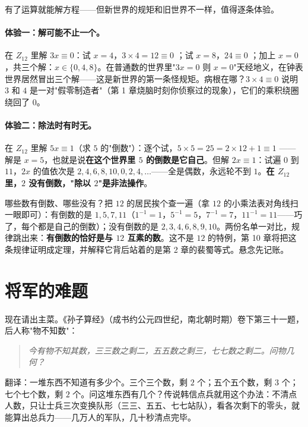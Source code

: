 有了运算就能解方程——但新世界的规矩和旧世界不一样，值得逐条体验。

\paragraph{体验一：解可能不止一个。}在 $Z_{12}$ 里解 $3x \equiv 0$：试 $x = 4$，$3\times4 = 12 \equiv 0$ \checkmark；试 $x = 8$，$24 \equiv 0$ \checkmark；加上 $x = 0$，共三个解：$x \in \{0, 4, 8\}$。在普通数的世界里"$3x = 0$ 则 $x = 0$"天经地义，在钟表世界居然冒出三个解——这是新世界的第一条怪规矩。病根在哪？$3 \times 4 \equiv 0$ 说明 $3$ 和 $4$ 是一对"假零制造者"（第 1 章烧脑时刻你侦察过的现象），它们的乘积绕圈绕回了 $0$。

\paragraph{体验二：除法时有时无。}在 $Z_{12}$ 里解 $5x \equiv 1$（求 $5$ 的"倒数"）：逐个试，$5\times5 = 25 = 2\times12+1 \equiv 1$ \checkmark——解是 $x = 5$，也就是说\textbf{在这个世界里 $5$ 的倒数是它自己}。但解 $2x \equiv 1$：试遍 $0$ 到 $11$，$2x$ 的值依次是 $2,4,6,8,10,0,2,4,\dots$——全是偶数，永远轮不到 $1$。\textbf{在 $Z_{12}$ 里，$2$ 没有倒数，"除以 $2$"是非法操作}。

哪些数有倒数、哪些没有？把 $12$ 的居民挨个查一遍（拿 $12$ 的小乘法表对角线扫一眼即可）：有倒数的是 $1, 5, 7, 11$（$1^{-1}=1$，$5^{-1}=5$，$7^{-1}=7$，$11^{-1}=11$——巧了，每个都是自己的倒数）；没有倒数的是 $2,3,4,6,8,9,10$。两份名单一对比，规律跳出来：\textbf{有倒数的恰好是与 $12$ 互素的数}。这不是 $12$ 的特例，第 10 章将把这条规律证明成定理，并解释它背后站着的是第 2 章的裴蜀等式。悬念先记账。

\section{将军的难题}

现在请出主菜。《孙子算经》（成书约公元四世纪，南北朝时期）卷下第三十一题，后人称"物不知数"：

\begin{quote}\itshape
今有物不知其数，三三数之剩二，五五数之剩三，七七数之剩二。问物几何？
\end{quote}

翻译：一堆东西不知道有多少个。三个三个数，剩 $2$ 个；五个五个数，剩 $3$ 个；七个七个数，剩 $2$ 个。问这堆东西有几个？传说韩信点兵就用这个办法：不清点人数，只让士兵三次变换队形（三三、五五、七七站队），看各次剩下的零头，就能算出总兵力——几万人的军队，几十秒清点完毕。

